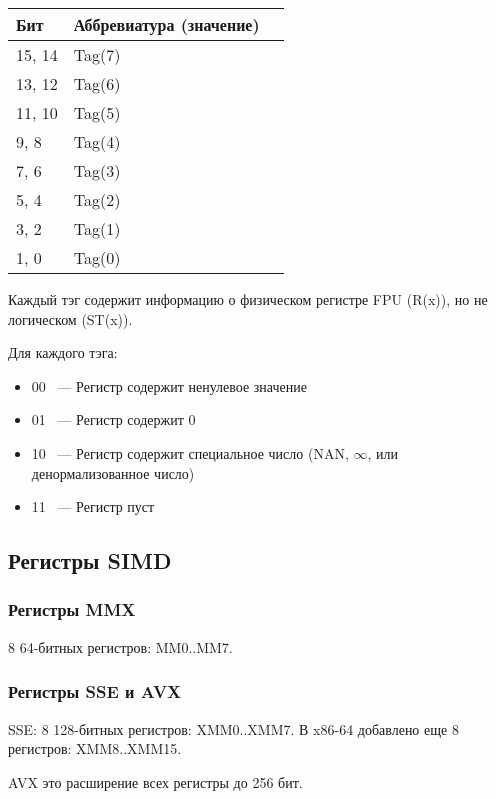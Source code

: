 \begin{center}
\begin{tabular}{ | l | l | l | }
\hline
Бит & Аббревиатура (значение) \\
\hline
15, 14 & Tag(7) \\
\hline
13, 12 & Tag(6) \\
\hline
11, 10 & Tag(5) \\
\hline
9, 8 & Tag(4) \\
\hline
7, 6 & Tag(3) \\
\hline
5, 4 & Tag(2) \\
\hline
3, 2 & Tag(1) \\
\hline
1, 0 & Tag(0) \\
\hline
\end{tabular}
\end{center}

Каждый тэг содержит информацию о физическом регистре FPU (R(x)), но не логическом (ST(x)).

Для каждого тэга:

\begin{itemize}
\item 00 ~--- Регистр содержит ненулевое значение
\item 01 ~--- Регистр содержит 0
\item 10 ~--- Регистр содержит специальное число (\ac{NAN}, $\infty$, или денормализованное число)
\item 11 ~--- Регистр пуст
\end{itemize}

\subsection{Регистры SIMD}

\subsubsection{Регистры MMX}

8 64-битных регистров: MM0..MM7.

\subsubsection{Регистры SSE и AVX}

SSE: 8 128-битных регистров: XMM0..XMM7.
В x86-64 добавлено еще 8 регистров: XMM8..XMM15.

AVX это расширение всех регистры до 256 бит.




